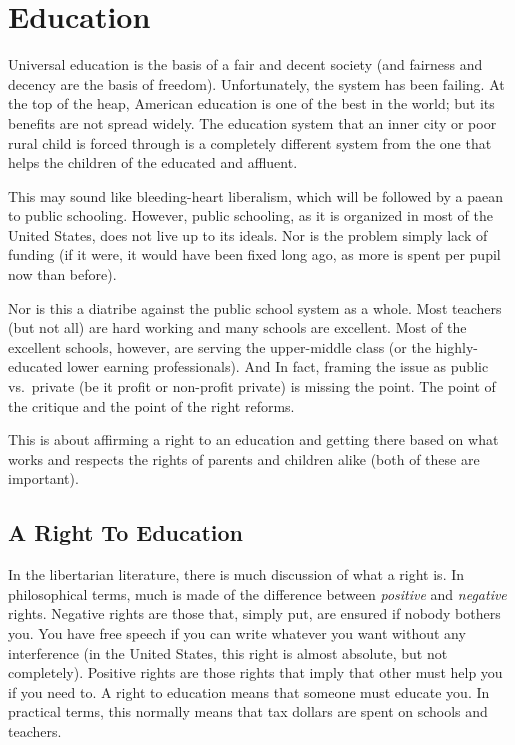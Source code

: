\chapter{Education}%
\label{chpt:education}

Universal education is the basis of a fair and decent society (and fairness and
decency are the basis of freedom). Unfortunately, the system has been failing.
At the top of the heap, American education is one of the best in the world; but
its benefits are not spread widely. The education system that an inner city or
poor rural child is forced through is a completely different system from the
one that helps the children of the educated and affluent.

This may sound like bleeding-heart liberalism, which will be followed by a
paean to public schooling. However, public schooling, as it is organized in
most of the United States, does not live up to its ideals. Nor is the
problem simply lack of funding (if it were, it would have been fixed long ago,
as more is spent per pupil now than before).

Nor is this a diatribe against the public school system as a whole. Most
teachers (but not all) are hard working and many schools are excellent. Most of
the excellent schools, however, are serving the upper-middle class (or the
highly-educated lower earning professionals). And In fact, framing the issue as
public vs.\ private (be it profit or non-profit private) is missing the point.
The point of the critique and the point of the right reforms.

This is about affirming a right to an education and getting there based on what
works and respects the rights of parents and children alike (both of these are
important).

\section{A Right To Education}

In the libertarian literature, there is much discussion of what a right is. In
philosophical terms, much is made of the difference between \emph{positive} and
\emph{negative} rights. Negative rights are those that, simply put, are ensured
if nobody bothers you. You have free speech if you can write whatever you want
without any interference (in the United States, this right is almost
absolute, but not completely). Positive rights are those rights that imply that
other must help you if you need to. A right to education means that someone
must educate you. In practical terms, this normally means that tax dollars are
spent on schools and teachers.

